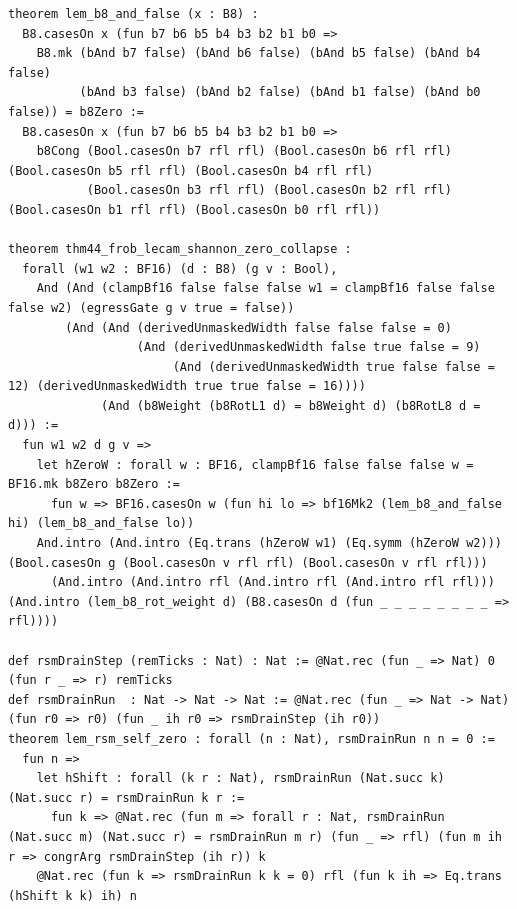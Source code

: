 \documentclass[11pt,letterpaper]{article}
\theoremstyle{spectralthm}
\begin{document}
\begin{lstlisting}[language=Lean4,caption={Standalone Pure Init.Prelude Term-Mode Lean 4 Kernel Suite (thm30--thm61, v0.0.0, 0 sorry, 0 axioms).},label={lst:lean_unified}]
theorem lem_b8_and_false (x : B8) :
  B8.casesOn x (fun b7 b6 b5 b4 b3 b2 b1 b0 =>
    B8.mk (bAnd b7 false) (bAnd b6 false) (bAnd b5 false) (bAnd b4 false)
          (bAnd b3 false) (bAnd b2 false) (bAnd b1 false) (bAnd b0 false)) = b8Zero :=
  B8.casesOn x (fun b7 b6 b5 b4 b3 b2 b1 b0 =>
    b8Cong (Bool.casesOn b7 rfl rfl) (Bool.casesOn b6 rfl rfl) (Bool.casesOn b5 rfl rfl) (Bool.casesOn b4 rfl rfl)
           (Bool.casesOn b3 rfl rfl) (Bool.casesOn b2 rfl rfl) (Bool.casesOn b1 rfl rfl) (Bool.casesOn b0 rfl rfl))

theorem thm44_frob_lecam_shannon_zero_collapse :
  forall (w1 w2 : BF16) (d : B8) (g v : Bool),
    And (And (clampBf16 false false false w1 = clampBf16 false false false w2) (egressGate g v true = false))
        (And (And (derivedUnmaskedWidth false false false = 0)
                  (And (derivedUnmaskedWidth false true false = 9)
                       (And (derivedUnmaskedWidth true false false = 12) (derivedUnmaskedWidth true true false = 16))))
             (And (b8Weight (b8RotL1 d) = b8Weight d) (b8RotL8 d = d))) :=
  fun w1 w2 d g v =>
    let hZeroW : forall w : BF16, clampBf16 false false false w = BF16.mk b8Zero b8Zero :=
      fun w => BF16.casesOn w (fun hi lo => bf16Mk2 (lem_b8_and_false hi) (lem_b8_and_false lo))
    And.intro (And.intro (Eq.trans (hZeroW w1) (Eq.symm (hZeroW w2))) (Bool.casesOn g (Bool.casesOn v rfl rfl) (Bool.casesOn v rfl rfl)))
      (And.intro (And.intro rfl (And.intro rfl (And.intro rfl rfl))) (And.intro (lem_b8_rot_weight d) (B8.casesOn d (fun _ _ _ _ _ _ _ _ => rfl))))

def rsmDrainStep (remTicks : Nat) : Nat := @Nat.rec (fun _ => Nat) 0 (fun r _ => r) remTicks
def rsmDrainRun  : Nat -> Nat -> Nat := @Nat.rec (fun _ => Nat -> Nat) (fun r0 => r0) (fun _ ih r0 => rsmDrainStep (ih r0))
theorem lem_rsm_self_zero : forall (n : Nat), rsmDrainRun n n = 0 :=
  fun n =>
    let hShift : forall (k r : Nat), rsmDrainRun (Nat.succ k) (Nat.succ r) = rsmDrainRun k r :=
      fun k => @Nat.rec (fun m => forall r : Nat, rsmDrainRun (Nat.succ m) (Nat.succ r) = rsmDrainRun m r) (fun _ => rfl) (fun m ih r => congrArg rsmDrainStep (ih r)) k
    @Nat.rec (fun k => rsmDrainRun k k = 0) rfl (fun k ih => Eq.trans (hShift k k) ih) n


\end{lstlisting}
\end{document}
